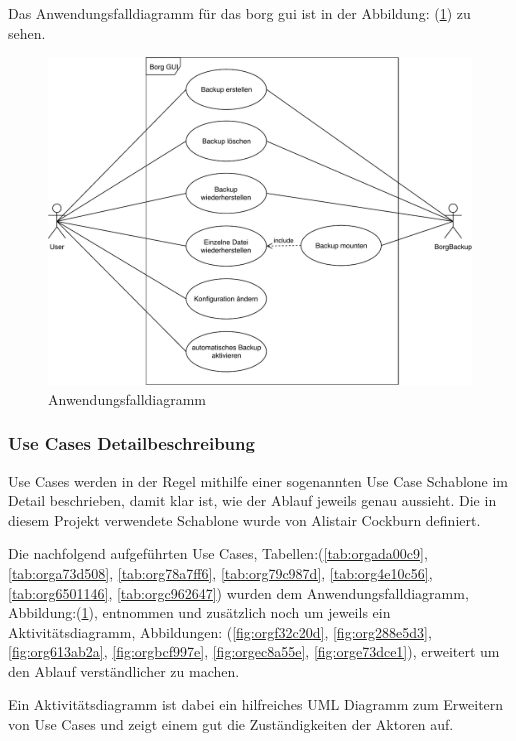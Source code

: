 Das Anwendungsfalldiagramm für das \gls{borg} \gls{gui} ist in der Abbildung:
(\ref{fig:org49a405a}) zu sehen.

\newpage
\begin{landscape}
\begin{figure}[htbp]
\centering
\includegraphics[width=.75\linewidth]{pictures/use_case.pdf}
\caption{\label{fig:org49a405a}
Anwendungsfalldiagramm}
\end{figure}
\end{landscape}
\newpage

\subsubsection{Use Cases Detailbeschreibung}
\label{sec:org7eb46b4}

Use Cases werden in der Regel mithilfe einer sogenannten Use Case Schablone im
Detail beschrieben, damit klar ist, wie der Ablauf jeweils genau aussieht. Die
in diesem Projekt verwendete Schablone wurde von Alistair Cockburn definiert.

Die nachfolgend aufgeführten Use Cases, Tabellen:(\ref{tab:orgada00c9}, \ref{tab:orga73d508},
\ref{tab:org78a7ff6}, \ref{tab:org79c987d}, \ref{tab:org4e10c56}, \ref{tab:org6501146}, \ref{tab:orgc962647})
wurden dem Anwendungsfalldiagramm, Abbildung:(\ref{fig:org49a405a}), entnommen und
zusätzlich noch um jeweils ein Aktivitätsdiagramm, Abbildungen:
(\ref{fig:orgf32c20d}, \ref{fig:org288e5d3}, \ref{fig:org613ab2a},
\ref{fig:orgbcf997e}, \ref{fig:orgec8a55e}, \ref{fig:orge73dce1}), erweitert
um den Ablauf verständlicher zu machen.

Ein Aktivitätsdiagramm ist dabei ein hilfreiches UML Diagramm zum Erweitern von
Use Cases und zeigt einem gut die Zuständigkeiten der Aktoren auf.

